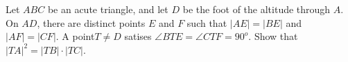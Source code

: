 Let $ABC$ be an acute triangle, and let $D$ be the foot of the altitude through $A$. On $AD$,  there are distinct points $E$ and $F$ such that $|AE| = |BE|$ and $|AF| =|CF|$. A point$ T \ne D$ satises $\angle BTE = \angle CTF = 90^o$. Show that $|TA|^2 =|TB| \cdot  |TC|$.